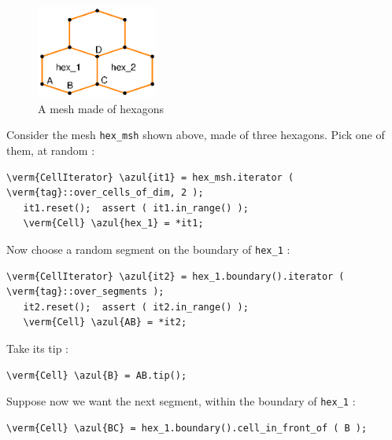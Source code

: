 \begin{figure}[ht] \centering
  \includegraphics[width=40mm]{malha-hex}
  \caption{A mesh made of hexagons}
  \label{\numb section 9.\numb fig 3}
\end{figure}

Consider the mesh {\small\tt hex\_msh} shown above, made of three hexagons.
Pick one of them, at random :

\begin{Verbatim}[commandchars=\\\{\},formatcom=\small\tt,
   baselinestretch=0.94,framesep=2mm                      ]
   \verm{CellIterator} \azul{it1} = hex_msh.iterator ( \verm{tag}::over_cells_of_dim, 2 );
   it1.reset();  assert ( it1.in_range() );
   \verm{Cell} \azul{hex_1} = *it1;
\end{Verbatim}

Now choose a random segment on the boundary of {\small\tt hex\_1} :

\begin{Verbatim}[commandchars=\\\{\},formatcom=\small\tt,
   baselinestretch=0.94,framesep=2mm                      ]
   \verm{CellIterator} \azul{it2} = hex_1.boundary().iterator ( \verm{tag}::over_segments );
   it2.reset();  assert ( it2.in_range() );
   \verm{Cell} \azul{AB} = *it2;
\end{Verbatim}

Take its tip :

\begin{Verbatim}[commandchars=\\\{\},formatcom=\small\tt,
   baselinestretch=0.94,framesep=2mm                      ]
   \verm{Cell} \azul{B} = AB.tip();
\end{Verbatim}

Suppose now we want the next segment, within the boundary of {\small\tt hex\_1} :

\begin{Verbatim}[commandchars=\\\{\},formatcom=\small\tt,
   baselinestretch=0.94,framesep=2mm                      ]
   \verm{Cell} \azul{BC} = hex_1.boundary().cell_in_front_of ( B );
\end{Verbatim}

